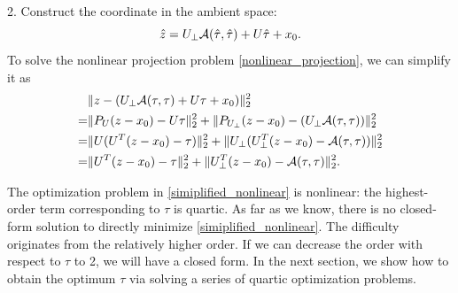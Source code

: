 \documentclass{article}
\theoremstyle{remark}
\begin{document}
2. Construct the coordinate in the ambient space:
\[
\hat{z} = U_{\perp} {\cal A} (\hat{\tau},\hat{\tau}) + U \hat{\tau} +x_0.
\]
To solve the nonlinear projection problem \eqref{nonlinear_projection}, we can simplify it as
\begin{equation}\label{simiplified_nonlinear}
\begin{aligned}
   &\|z -  (U_{\perp} {\cal A} (\tau,\tau) + U \tau +x_0)\|_2^2\\
 =&\|P_U(z-x_0)-U\tau\|_2^2+\|P_{U_{\perp}}(z-x_0)-(U_{\perp} {\cal A}(\tau,\tau))\|_2^2 \\
  =&\|U (U^T (z-x_0)-\tau)\|_2^2+\|U_\perp (U_{\perp}^T(z-x_0)- {\cal A}(\tau,\tau))\|_2^2 \\
 =&\|U^T (z-x_0)-\tau\|_2^2+\|U^T_{\perp}(z-x_0)- {\cal A} (\tau,\tau)\|_2^2.
\end{aligned}
\end{equation}

The optimization problem in \eqref{simiplified_nonlinear} is nonlinear: the highest-order term corresponding to $\tau$ is quartic. As far as we know, there is no closed-form solution to directly minimize \eqref{simiplified_nonlinear}. The difficulty originates from the relatively higher order. If we can decrease the order with respect to $\tau$ to 2, we will have a closed form. In the next section, we show how to obtain the optimum $\tau$ via solving a series of quartic optimization problems.
\end{document}
